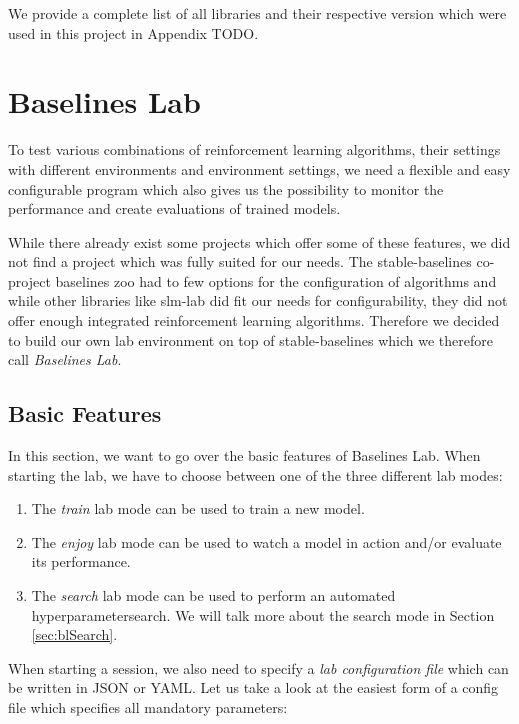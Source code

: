 We provide a complete list of all libraries and their respective version which were used in this project in Appendix TODO.  

\section{Baselines Lab} \label{sec:BaselinesLab}
To test various combinations of reinforcement learning algorithms, their settings with different environments and environment settings, we need a flexible and easy configurable program which also gives us the possibility to monitor the performance and create evaluations of trained models. 

While there already exist some projects which offer some of these features, we did not find a project which was fully suited for our needs. The stable-baselines co-project baselines zoo \cite{rl-zoo} had to few options for the configuration of algorithms and while other libraries like slm-lab \cite{kenggraesser2017slmlab} did fit our needs for configurability, they did not offer enough integrated reinforcement learning algorithms. Therefore we decided to build our own lab environment on top of stable-baselines which we therefore call \textit{Baselines Lab}.

\subsection{Basic Features} \label{sec:blFunctions}
In this section, we want to go over the basic features of Baselines Lab. When starting the lab, we have to choose between one of the three different lab modes:

\begin{enumerate}
    \item The \textit{train} lab mode can be used to train a new model.
    \item The \textit{enjoy} lab mode can be used to watch a model in action and/or evaluate its performance.
    \item The \textit{search} lab mode can be used to perform an automated hyperparametersearch. We will talk more about the search mode in Section \ref{sec:blSearch}.
\end{enumerate}

When starting a session, we also need to specify a \textit{lab configuration file} which can be written in JSON or YAML. Let us take a look at the easiest form of a config file which specifies all mandatory parameters:

